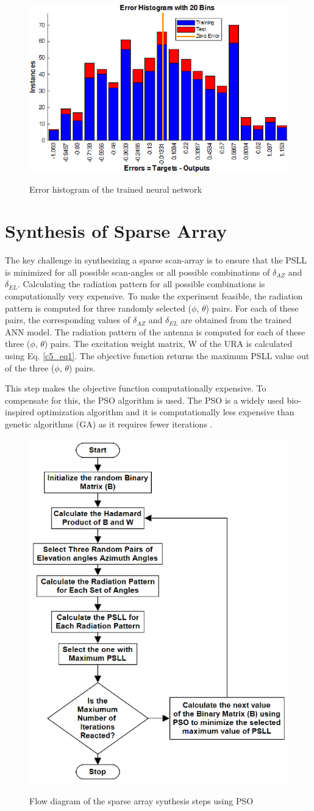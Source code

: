 \begin{figure}
  \centering
  \includegraphics[width=0.5\linewidth]{Fig-naun_5.eps}\\
  \caption{Error histogram of the trained neural network} \label{fig_5_5}
\end{figure}

\section{Synthesis of Sparse Array}\label{c5sec_synth}
The key challenge in synthesizing a sparse scan-array is to ensure that the PSLL is minimized for all possible scan-angles or all possible combinations of $\delta_{AZ}$ and $\delta_{EL}$. Calculating the radiation pattern for all possible combinations is computationally very expensive. To make the experiment feasible, the radiation pattern is computed for three randomly selected ($\phi$, $\theta$) pairs. For each of these pairs, the corresponding values of $\delta_{AZ}$ and $\delta_{EL}$ are obtained from the trained ANN model. The radiation pattern of the antenna is computed for each of these three ($\phi$, $\theta$) pairs. The excitation weight matrix, W of the URA is calculated using Eq. \ref{c5_eq1}. The objective function returns the maximum PSLL value out of the three ($\phi$, $\theta$) pairs.

This step makes the objective function computationally expensive. To compensate for this, the PSO algorithm is used. The PSO is a widely used bio-inspired optimization algorithm and it is computationally less expensive than genetic algorithms (GA) as it requires fewer iterations \cite{pso_vs_ga}.

\begin{figure}
  \centering
  \includegraphics[width=0.5\linewidth]{Fig-naun_6.eps}\\
  \caption{Flow diagram of the sparse array synthesis steps using PSO} \label{fig_5_6}
\end{figure}

